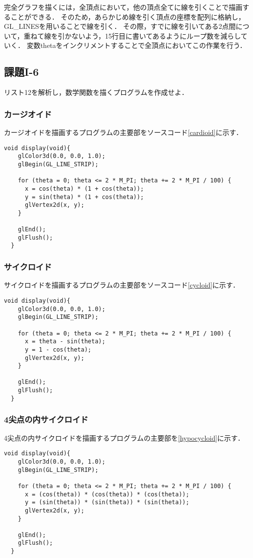 \documentclass[]{jarticle}
\begin{document}
完全グラフを描くには，全頂点において，他の頂点全てに線を引くことで描画することができる．
そのため，あらかじめ線を引く頂点の座標を配列に格納し，GL\_LINESを用いることで線を引く．
その際，すでに線を引いてある2点間について，重ねて線を引かないよう，15行目に書いてあるようにループ数を減らしていく．
変数thetaをインクリメントすることで全頂点においてこの作業を行う．
\subsection{課題I-6}
リスト12を解析し，数学関数を描くプログラムを作成せよ．
\subsubsection{カージオイド}
カージオイドを描画するプログラムの主要部をソースコード\ref{cardioid}に示す．
\begin{lstlisting}[caption=カージオイドの描画,label=cardioid]
  void display(void){
    glColor3d(0.0, 0.0, 1.0);
    glBegin(GL_LINE_STRIP);
    
    for (theta = 0; theta <= 2 * M_PI; theta += 2 * M_PI / 100) {
      x = cos(theta) * (1 + cos(theta));
      y = sin(theta) * (1 + cos(theta));
      glVertex2d(x, y);
    }
    
    glEnd();
    glFlush();
  }
\end{lstlisting}

\subsubsection{サイクロイド}
サイクロイドを描画するプログラムの主要部をソースコード\ref{cycloid}に示す．
\begin{lstlisting}[caption=サイクロイドの描画,label=cycloid]
  void display(void){
    glColor3d(0.0, 0.0, 1.0);
    glBegin(GL_LINE_STRIP);
    
    for (theta = 0; theta <= 2 * M_PI; theta += 2 * M_PI / 100) {
      x = theta - sin(theta);
      y = 1 - cos(theta);
      glVertex2d(x, y);
    }
    
    glEnd();
    glFlush();
  }
\end{lstlisting}

\subsubsection{4尖点の内サイクロイド}
4尖点の内サイクロイドを描画するプログラムの主要部を\ref{hypocycloid}に示す．
\begin{lstlisting}[caption=4尖点の内サイクロイドの描画,label=hypocycloid]
  void display(void){
    glColor3d(0.0, 0.0, 1.0);
    glBegin(GL_LINE_STRIP);
    
    for (theta = 0; theta <= 2 * M_PI; theta += 2 * M_PI / 100) {
      x = (cos(theta)) * (cos(theta)) * (cos(theta));
      y = (sin(theta)) * (sin(theta)) * (sin(theta));
      glVertex2d(x, y);
    }
    
    glEnd();
    glFlush();
  }
\end{lstlisting}
\end{document}
